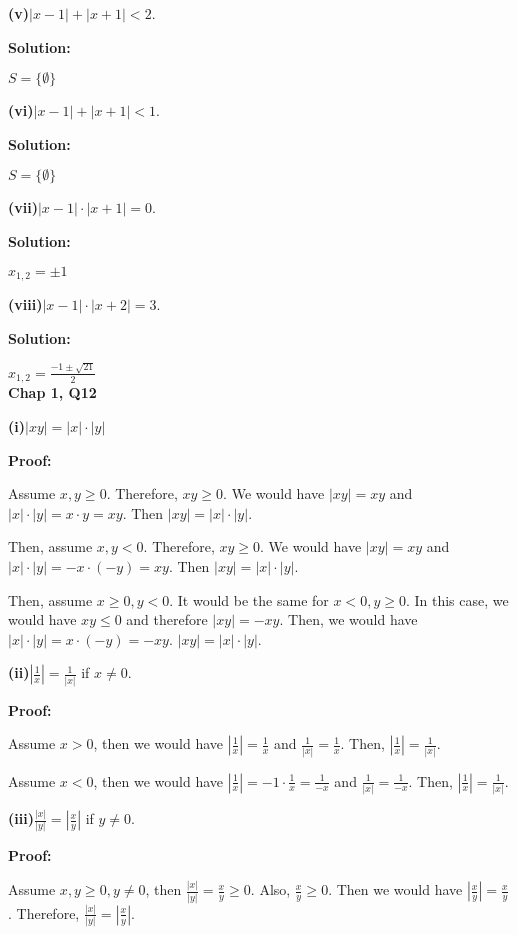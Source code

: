\documentclass[a4paper,12pt]{report}
\begin{document}
\noindent
\textbf{(v)}$|x-1| + |x+1|<2$.

\noindent
\textbf{Solution:}

\noindent
$S=\{\emptyset\}$

\noindent
\textbf{(vi)}$|x-1| + |x+1|<1$.

\noindent
\textbf{Solution:}

\noindent
$S=\{\emptyset\}$

\pagebreak
\noindent
\textbf{(vii)}$|x-1| \cdot{|x+1|} = 0$.

\noindent
\textbf{Solution:}

\noindent
$x_{1,2}=\pm1$

\noindent
\textbf{(viii)}$|x-1| \cdot{|x+2|} = 3$.

\noindent
\textbf{Solution:}

\noindent
$x_{1,2}=\frac{-1\pm\sqrt{21}}{2}$\\

\noindent
\textbf{Chap 1, Q12}

\noindent
\textbf{(i)}$|xy|=|x|\cdot{|y|}$

\noindent
\textbf{Proof: }

\noindent
Assume $x,y \geq 0$. Therefore, $xy \geq 0$. We would have $|xy|=xy$ and $|x|\cdot{|y|}=x\cdot{y} = xy$. Then $|xy|=|x|\cdot{|y|}$.

\noindent
Then, assume $x,y < 0$. Therefore, $xy \geq 0$. We would have $|xy|=xy$ and $|x|\cdot{|y|}=-x\cdot{(-y)} = xy$. Then $|xy|=|x|\cdot{|y|}$.

\noindent
Then, assume $x\geq 0, y<0$. It would be the same for $x<0,y\geq 0$. In this case, we would have $xy \leq 0$ and therefore $|xy|=-xy$. Then, we would have $|x|\cdot{|y|}=x\cdot{(-y)} = -xy$. $|xy|=|x|\cdot{|y|}$.

\noindent
\textbf{(ii)}$|\frac{1}{x}|=\frac{1}{|x|}$ if $x\neq 0$.

\noindent
\textbf{Proof: }

Assume $x> 0$, then we would have $|\frac{1}{x}|=\frac{1}{x}$ and $\frac{1}{|x|}=\frac{1}{x}$. Then,  $|\frac{1}{x}|=\frac{1}{|x|}$. 

Assume $x< 0$, then we would have $|\frac{1}{x}|=-1\cdot{\frac{1}{x}}=\frac{1}{-x}$ and $\frac{1}{|x|}=\frac{1}{-x}$. Then,  $|\frac{1}{x}|=\frac{1}{|x|}$. 

\noindent
\textbf{(iii)}$\frac{|x|}{|y|}=|\frac{x}{y}|$ if $y\neq 0$.

\noindent
\textbf{Proof: }

\noindent
Assume $x, y\geq 0, y\neq 0$, then $\frac{|x|}{|y|}=\frac{x}{y}\geq 0$. Also, $\frac{x}{y}\geq 0$. Then we would have $|\frac{x}{y}|=\frac{x}{y}$. Therefore, $\frac{|x|}{|y|}=|\frac{x}{y}|$.
\end{document}
